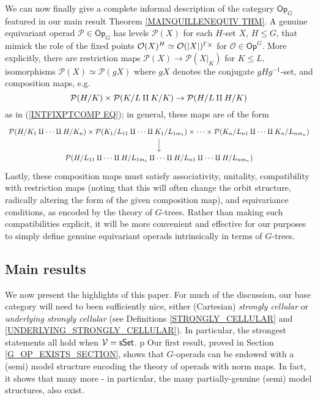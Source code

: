 \documentclass[a4paper,10pt]{article}%
\begin{document}
We can now finally give a complete informal description of the category $\mathsf{Op}_G$ featured in 
our main result Theorem \ref{MAINQUILLENEQUIV THM}.
A genuine equivariant operad
$\mathcal{P} \in \mathsf{Op}_G$
has levels $\mathcal{P}(X)$ for each $H$-set $X$, $H\leq G$, 
that mimick the role of the fixed points $\O(X)^H \simeq \O(|X|)^{\Gamma_X}$ for 
$\mathcal{O} \in \mathsf{Op}^G$.
More explicitly, there are restriction maps 
$\mathcal{P}(X) \to \mathcal{P}(X|_{K})$ for $K \leq L$,
isomorphisms
$\mathcal{P}(X)\simeq \mathcal{P}(g X)$
where $gX$ denotes the conjugate $gHg^{-1}$-set,
and composition maps, e.g.%
\[
\P(H/K) \times \P(K/L \amalg K/K) \to \P(H/L \amalg H/K)
\]
as in (\ref{INTFIXPTCOMP EQ}); in general, these maps are of the form
\[
\begin{tikzcd}
  \mathcal{P}(H/K_1 \amalg \cdots \amalg H/K_n)
  \times
  \mathcal{P}(K_1 / L_{11} \amalg \cdots \amalg K_1/L_{1 m_1})
  \times \cdots \times
  \mathcal{P}(K_n / L_{n1} \amalg \cdots \amalg K_n / L_{n m_n})
  \arrow[d]
  \\
  \mathcal{P}(H / L_{11} \amalg \cdots \amalg H/L_{1 m_1}
  \amalg \cdots \amalg
  H / L_{n1} \amalg \cdots \amalg H/L_{n m_n}
  )
\end{tikzcd}
\]
Lastly, these composition maps %
must satisfy associativity, unitality, compatibility with restriction maps (noting that this will often change the orbit structure, radically altering the form of the given composition map), and equivariance conditions, as encoded by the theory of $G$-trees. Rather than making such compatibilities explicit, it will be more convenient and effective for our purposes to simply define genuine equivariant operads intrinsically in terms of $G$-trees.



\subsection{Main results}



We now present the highlights of this paper. 
For much of the discussion, our base category will need to been sufficiently nice, either (Cartesian) \textit{strongly cellular} or \textit{underlying strongly cellular} (see Definitions \ref{STRONGLY_CELLULAR} and \ref{UNDERLYING_STRONGLY_CELLULAR}). In particular, the strongest statements all hold when $\V = \sSet$.
p
Our first result, proved in Section \ref{G_OP_EXISTS_SECTION}, shows that $G$-operads can be endowed with a (semi) model structure encoding the theory of operads with norm maps. In fact, it shows that many more - in particular, the many partially-genuine (semi) model structures, also exist.
\end{document}
